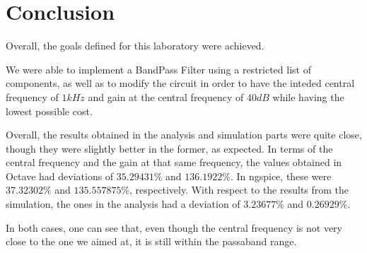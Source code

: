 \section{Conclusion}
\label{sec:conclusion}


Overall, the goals defined for this laboratory were achieved.

We were able to implement a BandPass Filter using a restricted list of components, as well as to modify the circuit in order to have the inteded central frequency of $1kHz$ and gain at the central frequency of $40 dB$ while having the lowest possible cost.

Overall, the results obtained in the analysis and simulation parts were quite close, though they were slightly better in the former, as expected. In terms of the central frequency and the gain at that same frequency, the values obtained in Octave had deviations of $35.29431 \%$ and $136.1922 \%$. In ngspice, these were $37.32302\%$ and $135.557875 \%$, respectively. With respect to the results from the simulation, the ones in the analysis had a deviation of $3.23677\%$ and $0.26929\%$.


In both cases, one can see that, even though the central frequency is not very close to the one we aimed at, it is still within the passaband range.
